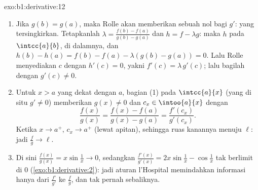 \begin{solution}{exo:b1:derivative:12}
\begin{enumerate}
  \item Jika $g(b) = g(a)$, maka Rolle akan memberikan sebuah nol  bagi
        $g'$: yang tersingkirkan. Tetapkanlah $\lambda = \frac{f(b) - f(a)}{g(b) -
        g(a)}$ dan $h = f - \lambda g$: maka $h$  pada
        $\intcc{a}{b}$,  di dalamnya, dan $h(b) - h(a)
        = f(b) - f(a) - \lambda(g(b) - g(a)) = 0$. Lalu Rolle
        menyediakan $c$ dengan $h'(c) = 0$, yakni $f'(c) =
        \lambda\,g'(c)$; lalu bagilah dengan $g'(c) \neq 0$.
  \item Untuk $x > a$ yang dekat dengan $a$, bagian (1) pada $\intcc{a}{x}$
        (yang di situ $g' \neq 0$) memberikan $g(x) \neq 0$ dan $c_x \in
        \intoo{a}{x}$ dengan
        \[
        \frac{f(x)}{g(x)} = \frac{f(x) - f(a)}{g(x) - g(a)}
        = \frac{f'(c_x)}{g'(c_x)} .
        \]
        Ketika $x \to a^+$, $c_x \to a^+$ (lewat apitan), sehingga ruas
        kanannya menuju $\ell$: jadi $\frac{f}{g} \to \ell$.
  \item Di sini $\frac{f(x)}{g(x)} = x\sin\frac1x \to 0$, sedangkan
        $\frac{f'(x)}{g'(x)} = 2x\sin\frac1x - \cos\frac1x$ tak
        berlimit di $0$ (\cref{exo:b1:derivative:2}):
        jadi aturan l'Hospital memindahkan informasi hanya dari
        $\frac{f'}{g'}$ ke $\frac fg$, dan tak pernah sebaliknya.
\end{enumerate}
\end{solution}

